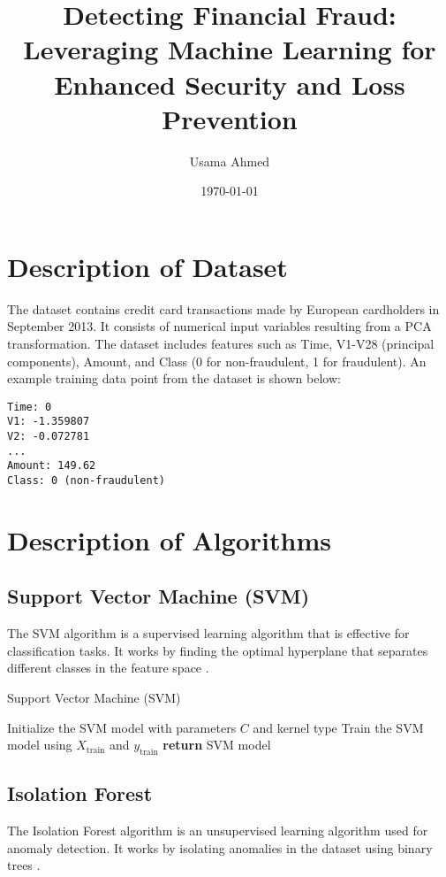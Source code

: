 \documentclass{article}
\begin{document}
\title{Detecting Financial Fraud: Leveraging Machine Learning for
Enhanced Security and Loss Prevention}
\author{Usama Ahmed}
\date{\today}
\maketitle

\section{Description of Dataset}
The dataset contains credit card transactions made by European cardholders in September 2013. 
It consists of numerical input variables resulting from a PCA transformation. The dataset \cite{dataset} 
includes features such as Time, V1-V28 (principal components), Amount, and Class (0 for non-fraudulent, 1 for fraudulent).
An example training data point from the dataset is shown below:

\begin{verbatim}
Time: 0
V1: -1.359807
V2: -0.072781
...
Amount: 149.62
Class: 0 (non-fraudulent)
\end{verbatim}


\section{Description of Algorithms}
\subsection{Support Vector Machine (SVM)}
The SVM algorithm is a supervised learning algorithm that is effective for classification tasks. It works by finding the optimal hyperplane that separates different classes in the feature space \cite{SVM}.

\begin{algorithm}
    \caption{Support Vector Machine (SVM)}
    \begin{algorithmic}[1]
            \State Initialize the SVM model with parameters $C$ and kernel type
            \State Train the SVM model using $X_{\text{train}}$ and $y_{\text{train}}$
            \State \textbf{return} SVM model
        \EndProcedure
    \end{algorithmic}
\end{algorithm}

\subsection{Isolation Forest}
The Isolation Forest algorithm is an unsupervised learning algorithm used for anomaly detection. It works by isolating anomalies in the dataset using binary trees \cite{IF}.
\end{document}

